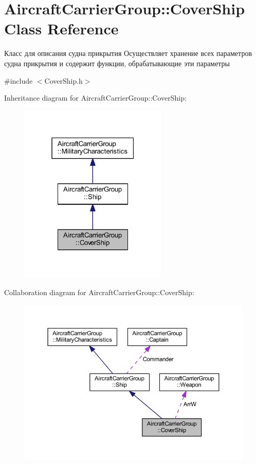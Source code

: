 \hypertarget{class_aircraft_carrier_group_1_1_cover_ship}{}\section{Aircraft\+Carrier\+Group\+:\+:Cover\+Ship Class Reference}
\label{class_aircraft_carrier_group_1_1_cover_ship}


Класс для описания судна прикрытия  Осуществляет хранение всех параметров судна прикрытия и содержит функции, обрабатывающие эти параметры  




{\ttfamily \#include $<$Cover\+Ship.\+h$>$}



Inheritance diagram for Aircraft\+Carrier\+Group\+:\+:Cover\+Ship\+:
\nopagebreak
\begin{figure}[H]
\begin{center}
\leavevmode
\includegraphics[width=199pt]{class_aircraft_carrier_group_1_1_cover_ship__inherit__graph}
\end{center}
\end{figure}


Collaboration diagram for Aircraft\+Carrier\+Group\+:\+:Cover\+Ship\+:
\nopagebreak
\begin{figure}[H]
\begin{center}
\leavevmode
\includegraphics[width=350pt]{class_aircraft_carrier_group_1_1_cover_ship__coll__graph}
\end{center}
\end{figure}
